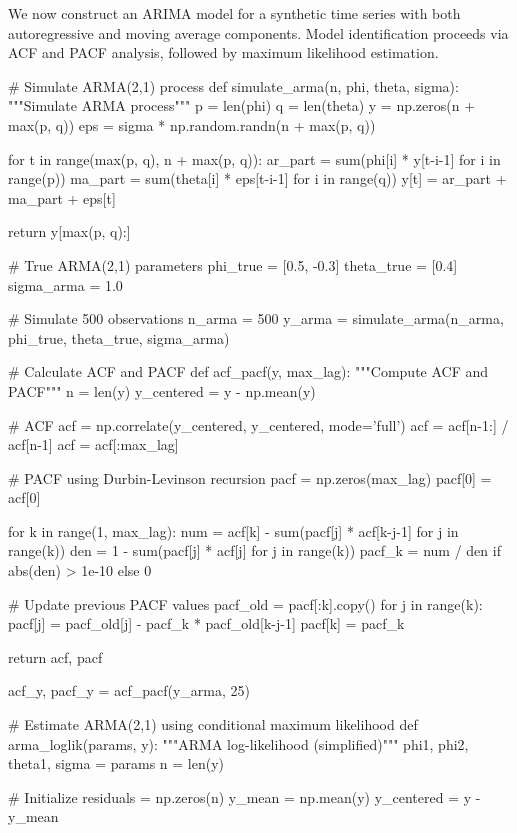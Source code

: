 \documentclass[a4paper, 11pt]{article}
\begin{document}
We now construct an ARIMA model for a synthetic time series with both autoregressive and moving
average components. Model identification proceeds via ACF and PACF analysis, followed by
maximum likelihood estimation.

\begin{pycode}
# Simulate ARMA(2,1) process
def simulate_arma(n, phi, theta, sigma):
    """Simulate ARMA process"""
    p = len(phi)
    q = len(theta)
    y = np.zeros(n + max(p, q))
    eps = sigma * np.random.randn(n + max(p, q))

    for t in range(max(p, q), n + max(p, q)):
        ar_part = sum(phi[i] * y[t-i-1] for i in range(p))
        ma_part = sum(theta[i] * eps[t-i-1] for i in range(q))
        y[t] = ar_part + ma_part + eps[t]

    return y[max(p, q):]

# True ARMA(2,1) parameters
phi_true = [0.5, -0.3]
theta_true = [0.4]
sigma_arma = 1.0

# Simulate 500 observations
n_arma = 500
y_arma = simulate_arma(n_arma, phi_true, theta_true, sigma_arma)

# Calculate ACF and PACF
def acf_pacf(y, max_lag):
    """Compute ACF and PACF"""
    n = len(y)
    y_centered = y - np.mean(y)

    # ACF
    acf = np.correlate(y_centered, y_centered, mode='full')
    acf = acf[n-1:] / acf[n-1]
    acf = acf[:max_lag]

    # PACF using Durbin-Levinson recursion
    pacf = np.zeros(max_lag)
    pacf[0] = acf[0]

    for k in range(1, max_lag):
        num = acf[k] - sum(pacf[j] * acf[k-j-1] for j in range(k))
        den = 1 - sum(pacf[j] * acf[j] for j in range(k))
        pacf_k = num / den if abs(den) > 1e-10 else 0

        # Update previous PACF values
        pacf_old = pacf[:k].copy()
        for j in range(k):
            pacf[j] = pacf_old[j] - pacf_k * pacf_old[k-j-1]
        pacf[k] = pacf_k

    return acf, pacf

acf_y, pacf_y = acf_pacf(y_arma, 25)

# Estimate ARMA(2,1) using conditional maximum likelihood
def arma_loglik(params, y):
    """ARMA log-likelihood (simplified)"""
    phi1, phi2, theta1, sigma = params
    n = len(y)

    # Initialize
    residuals = np.zeros(n)
    y_mean = np.mean(y)
    y_centered = y - y_mean


\end{pycode}
\end{document}
